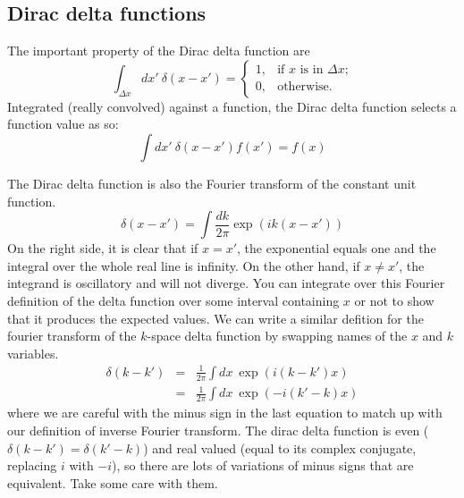 \subsection{Dirac delta functions}
The important property of the Dirac delta function are
\begin{equation}
  \int_{\Delta x} dx'\ \delta(x-x') = \left\{
  \begin{array}{ll} 1, & \mbox{if $x$ is in $\Delta x$;} \\ 0, & \mbox{otherwise.} \end{array}
  \right.
\end{equation}
Integrated (really convolved) against a function, the Dirac delta function selects a function value as so:
\begin{equation}
  \int dx'\ \delta(x-x') f(x') = f(x)
\end{equation}

The Dirac delta function is also the Fourier transform of the constant unit function.
\begin{equation}
   \delta(x-x') = \int \frac{dk}{2\pi} \exp(i k (x-x')) 
\end{equation}
On the right side, it is clear that if $x=x'$, the exponential equals one and the integral over the whole real line is infinity.  On the other hand, if $x \neq x'$, the integrand is oscillatory and will not diverge.  You can integrate over this Fourier definition of the delta function over some interval containing $x$ or not to show that it produces the expected values.  We can write a similar defition for the fourier transform of the $k$-space delta function by swapping names of the $x$ and $k$ variables.
\begin{eqnarray}
  \delta(k - k') &=& \frac{1}{2\pi}  \int {dx}\ \exp(i (k-k')x)    \\
  &=& \frac{1}{2\pi}  \int {dx}\ \exp(-i (k'-k)x) 
\end{eqnarray}
where we are careful with the minus sign in the last equation to match up with our definition of inverse Fourier transform.  The dirac delta function is even ($\delta(k-k') = \delta(k' - k)$) and real valued (equal to its complex conjugate, replacing $i$ with $-i$), so there are lots of variations of minus signs that are equivalent.  Take some care with them.

